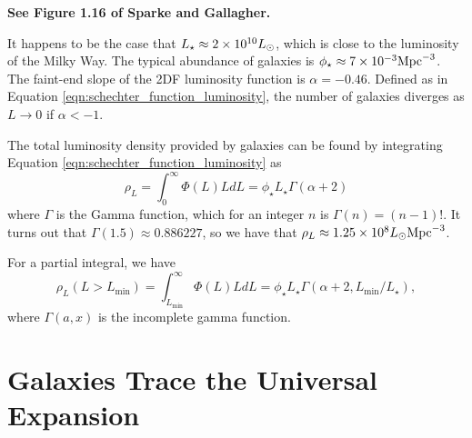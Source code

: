 \documentclass[]{article}
\begin{document}
{\bf See Figure 1.16 of Sparke and Gallagher.}

It happens to be the case that $L_{\star}\approx2\times10^{10}L_{\odot}$, which is close
to the luminosity of the Milky Way. The typical abundance of galaxies is $\phi_\star\approx7\times10^{-3}\mathrm{Mpc}^{-3}$. The faint-end slope of the 2DF luminosity function is $\alpha=-0.46$.
Defined as in Equation \ref{eqn:schechter_function_luminosity}, the number of galaxies
diverges as $L\to0$ if $\alpha<-1$.

The total luminosity density provided by galaxies can be found by integrating 
Equation \ref{eqn:schechter_function_luminosity} as
\begin{equation}
\rho_{L} = \int_{0}^{\infty} \Phi(L) L dL = \phi_\star L_{\star} \Gamma(\alpha + 2)
\end{equation}
\noindent
where $\Gamma$ is the Gamma function, which for an integer $n$ is $\Gamma(n) = (n-1)!$.
It turns out that $\Gamma(1.5)\approx0.886227$, so we have that 
$\rho_{L}\approx1.25\times10^{8}L_{\odot}\mathrm{Mpc}^{-3}$.

For a partial integral, we have
\begin{equation}
\rho_{L}(L>L_{\mathrm{min}}) = \int_{L_{\mathrm{min}}}^{\infty} \Phi(L) L dL = \phi_\star L_{\star} \Gamma(\alpha + 2, L_{\mathrm{min}}/L_{\star}),
\end{equation}
\noindent
where $\Gamma(a,x)$ is the incomplete gamma function.

\section{Galaxies Trace the Universal Expansion}
\end{document}
